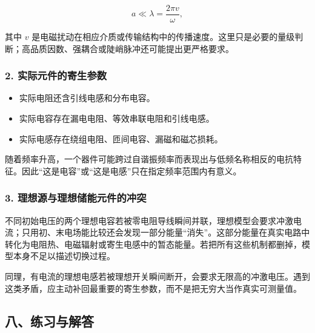 \[
a\ll\lambda=\frac{2\pi v}{\omega},
\]

其中 \(v\)
是电磁扰动在相应介质或传输结构中的传播速度。这里只是必要的量级判断；高品质因数、强耦合或陡峭脉冲还可能提出更严格要求。

\subsubsection{2.
实际元件的寄生参数}\label{m5:ux5b9eux9645ux5143ux4ef6ux7684ux5bc4ux751fux53c2ux6570}

\begin{itemize}
\tightlist
\item
  实际电阻还含引线电感和分布电容。
\item
  实际电容存在漏电电阻、等效串联电阻和引线电感。
\item
  实际电感存在绕组电阻、匝间电容、漏磁和磁芯损耗。
\end{itemize}

随着频率升高，一个器件可能跨过自谐振频率而表现出与低频名称相反的电抗特征。因此``这是电容''或``这是电感''只在指定频率范围内有意义。

\subsubsection{3.
理想源与理想储能元件的冲突}\label{m5:ux7406ux60f3ux6e90ux4e0eux7406ux60f3ux50a8ux80fdux5143ux4ef6ux7684ux51b2ux7a81}

不同初始电压的两个理想电容若被零电阻导线瞬间并联，理想模型会要求冲激电流；只用初、末电场能比较还会发现一部分能量``消失''。这部分能量在真实电路中转化为电阻热、电磁辐射或寄生电感中的暂态能量。若把所有这些机制都删掉，模型本身不足以描述切换过程。

同理，有电流的理想电感若被理想开关瞬间断开，会要求无限高的冲激电压。遇到这类矛盾，应主动补回最重要的寄生参数，而不是把无穷大当作真实可测量值。

\subsection{八、练习与解答}\label{m5:ux516bux7ec3ux4e60ux4e0eux89e3ux7b54-2}

